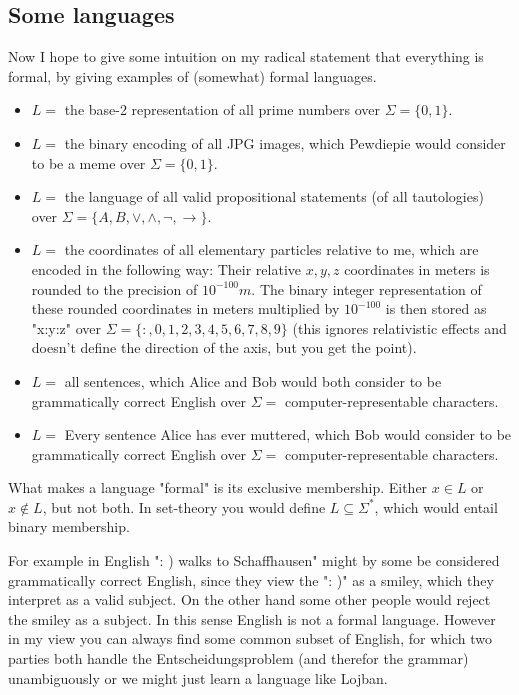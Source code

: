 \subsection{Some languages}
Now I hope to give some intuition on my radical statement that everything is formal, by giving  examples of (somewhat) formal languages. 

\begin{itemize}
\item $L =$ the base-2 representation of all prime numbers over $\Sigma = \{0,1\}$.
\item $L =$ the binary encoding of all JPG images, which Pewdiepie would consider to be a meme over $\Sigma = \{0,1\}$.
\item $L =$ the language of all valid propositional statements (of all tautologies) over $\Sigma = \{A,B,\vee,\wedge,\neg,\rightarrow\}$.
\item $L =$ the coordinates of all elementary particles relative to me, which are encoded in the following way: Their relative $x,y,z$ coordinates in meters is rounded to the precision of $10^{-100}m$. The binary integer representation of these rounded coordinates in meters multiplied by $10^{-100}$ is then stored as "x:y:z" over $\Sigma=\{:,0,1,2,3,4,5,6,7,8,9\}$ (this ignores relativistic effects and doesn't define the direction of the axis, but you get the point).
\item $L =$ all sentences, which Alice and Bob would both consider to be grammatically correct English over $\Sigma = $ computer-representable characters.
\item $L =$ Every sentence Alice has ever muttered, which Bob would consider to be grammatically correct English over $\Sigma = $ computer-representable characters.
\end{itemize}

What makes a language "formal" is its exclusive membership. Either $x \in L$ or $x \notin L$, but not both. In set-theory you would define $L \subseteq \Sigma^*$, which would entail binary membership.

For example in English ": ) walks to Schaffhausen" might by some be considered grammatically correct English, since they view the ": )" as a smiley, which they interpret as a valid subject. On the other hand some other people would reject the smiley as a subject. In this sense English is not a formal language.
 However in my view you can always find some common subset of English, for which two parties both handle the Entscheidungsproblem (and therefor the grammar) unambiguously or we might just learn a language like Lojban.


